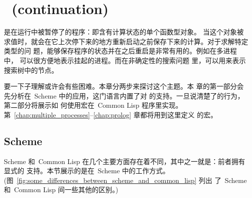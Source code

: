
\chapter{\continuation{}~(continuation)}
\label{chap:continuations}

\continuation{}是在运行中被暂停了的程序：即含有计算状态的单个函数型对象。
当这个对象被求值时，就会在它上次停下来的地方重新启动之前保存下来的计算。对于求解特定类型的问
题，能够保存程序的状态并在之后重启是非常有用的。例如在多进程中，
\continuation{}可以很方便地表示挂起的进程。而在非确定性的搜索问题
里，\continuation{}可以用来表示搜索树中的节点。

要一下子理解\continuation{}或许会有些困难。本章分两步来探讨这个主题。本
章的第一部分会先分析\continuation{}在~Scheme 中的应用，这门语言内置了对\continuation{}
的支持。一旦说清楚了\continuation{}的行为，第二部分将展示如
何使用宏在~Common Lisp 程序里实现\continuation{}。
第~\ref{chap:multiple_processes}--\ref{chap:prolog} 章都将用到这里定义
的宏。

\section{Scheme \continuation{}}
\label{sec:scheme_continuations}

Scheme 和~Common Lisp 在几个主要方面存在着不同，其中之一就是：前者拥有显式的
\continuation{}支持。本节展示的是\continuation{}在~Scheme 中的工作方式。
(图~\ref{fig:some_differences_between_scheme_and_common_lisp} 列出
了~Scheme 和~Common Lisp 间一些其他的区别。)

